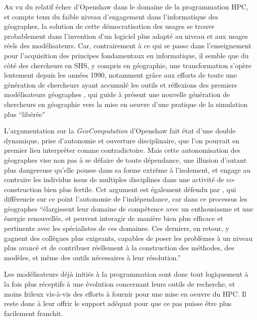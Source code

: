 Au vu du relatif échec d'Openshaw dans le domaine de la programmation HPC, et compte tenu du faible niveau d'engagement dans l'informatique des géographes, la solution de cette démocratisation des usages se trouve probablement dans l'invention d'un logiciel plus adapté au niveau et aux usages réels des modélisateurs. Car, contrairement à ce qui se passe dans l'enseignement pour l'acquisition des principes fondamentaux en informatique, il semble que du côté des chercheurs en SHS, y compris en géographie, une transformation s'opère lentement depuis les années 1990, notamment grâce aux efforts de toute une génération de chercheurs ayant accumulé les outils et réflexions des premiers modélisateurs géographes \autocite{Cuyala2014}, qui guide à présent une nouvelle génération de chercheurs en géographie vers la mise en oeuvre d'une pratique de la simulation plus \enquote{libérée} \autocite{Banos2013}

L’argumentation sur la \textit{GeoComputation} d’Openshaw fait état d’une double dynamique, prise d'autonomie et ouverture disciplinaire, que l’on pourrait en premier lieu interpréter comme contradictoire. Mais cette autonomisation des géographes vise non pas à se défaire de toute dépendance, une illusion d’autant plus dangereuse qu’elle pousse dans sa forme extrême à l’isolement, et engage au contraire les individus issus de multiples disciplines dans une activité de co-construction bien plus fertile. Cet argument est également défendu par \autocite[64]{Banos2013}, qui différencie sur ce point l’autonomie de l’indépendance, car dans ce processus les géographes \enquote{élargissent leur domaine de compétence avec un enthousiasme et une énergie renouvellés, et peuvent interagir de manière bien plus efficace et pertinente avec les spécialistes de ces domaines. Ces derniers, en retour, y gagnent des collègues plus exigeants, capables de poser les problèmes à un niveau plus avancé et de contribuer réellement à la construction des méthodes, des modèles, et même des outils nécessaires à leur résolution.}

Les modélisateurs déjà initiés à la programmation sont donc tout logiquement à la fois plus réceptifs à une évolution concernant leurs outils de recherche, et moins frileux vis-à-vis des efforts à fournir pour une mise en oeuvre du HPC.  Il reste donc à leur offrir le support adéquat pour que ce pas puisse être plus facilement franchit.


